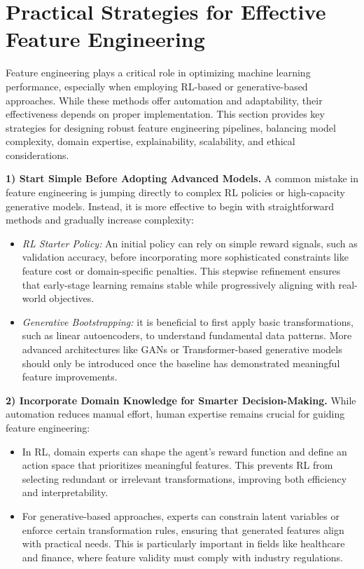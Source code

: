 \section{Practical Strategies for Effective Feature Engineering}
Feature engineering plays a critical role in optimizing machine learning performance, especially when employing RL-based or generative-based approaches. While these methods offer automation and adaptability, their effectiveness depends on proper implementation. This section provides key strategies for designing robust feature engineering pipelines, balancing model complexity, domain expertise, explainability, scalability, and ethical considerations.

\noindent
\textbf{1) Start Simple Before Adopting Advanced Models.}
A common mistake in feature engineering is jumping directly to complex RL policies or high-capacity generative models. Instead, it is more effective to begin with straightforward methods and gradually increase complexity:
\begin{itemize}
    \item \emph{RL Starter Policy:} An initial policy can rely on simple reward signals, such as validation accuracy, before incorporating more sophisticated constraints like feature cost or domain-specific penalties. This stepwise refinement ensures that early-stage learning remains stable while progressively aligning with real-world objectives.
    \item \emph{Generative Bootstrapping:} it is beneficial to first apply basic transformations, such as linear autoencoders, to understand fundamental data patterns. More advanced architectures like GANs or Transformer-based generative models should only be introduced once the baseline has demonstrated meaningful feature improvements.
\end{itemize}

\noindent
\textbf{2) Incorporate Domain Knowledge for Smarter Decision-Making.}
While automation reduces manual effort, human expertise remains crucial for guiding feature engineering:
\begin{itemize}
    \item In RL, domain experts can shape the agent’s reward function and define an action space that prioritizes meaningful features. This prevents RL from selecting redundant or irrelevant transformations, improving both efficiency and interpretability.
    \item For generative-based approaches, experts can constrain latent variables or enforce certain transformation rules, ensuring that generated features align with practical needs. This is particularly important in fields like healthcare and finance, where feature validity must comply with industry regulations.
\end{itemize}

